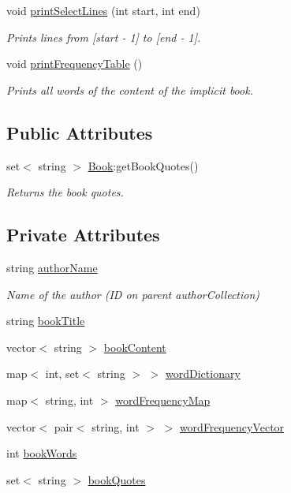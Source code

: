 \begin{DoxyCompactItemize}
void \hyperlink{class_book_a7193030998d6251851be26196762f8e6}{print\+Select\+Lines} (int start, int end)
\begin{DoxyCompactList}\small\item\em Prints lines from \mbox{[}start -\/ 1\mbox{]} to \mbox{[}end -\/ 1\mbox{]}. \end{DoxyCompactList}\item 
void \hyperlink{class_book_ac8b57c6a725ae9afeb24e6e74d4f8fd0}{print\+Frequency\+Table} ()
\begin{DoxyCompactList}\small\item\em Prints all words of the content of the implicit book. \end{DoxyCompactList}\end{DoxyCompactItemize}
\subsection*{Public Attributes}
\begin{DoxyCompactItemize}
\item 
set$<$ string $>$ \hyperlink{class_book_a5fea5dce5ba03d79378b2000f255de49}{Book}\+:get\+Book\+Quotes()
\begin{DoxyCompactList}\small\item\em Returns the book quotes. \end{DoxyCompactList}\end{DoxyCompactItemize}
\subsection*{Private Attributes}
\begin{DoxyCompactItemize}
\item 
string \hyperlink{class_book_a0dcb8f78ffb56c34e28f5d672b422e2a}{author\+Name}
\begin{DoxyCompactList}\small\item\em Name of the author (I\+D on parent author\+Collection) \end{DoxyCompactList}\item 
string \hyperlink{class_book_a111d7b30bddd6166bd09764f050cfee3}{book\+Title}
\item 
vector$<$ string $>$ \hyperlink{class_book_a62ca3f4431b699fa41384c8bab7ef4fa}{book\+Content}
\item 
map$<$ int, set$<$ string $>$ $>$ \hyperlink{class_book_a3e21a804bd433b6c1b05790856ec973f}{word\+Dictionary}
\item 
map$<$ string, int $>$ \hyperlink{class_book_a18b73c8d2b492cad5b7b0c187b08dfc0}{word\+Frequency\+Map}
\item 
vector$<$ pair$<$ string, int $>$ $>$ \hyperlink{class_book_ac58a87d14a302f7d437c1eaa1f1901fb}{word\+Frequency\+Vector}
\item 
int \hyperlink{class_book_a36f1e0b30a0ad17606976556cab45a23}{book\+Words}
\item 
set$<$ string $>$ \hyperlink{class_book_a370478eab144c20de936e1b68923e1c0}{book\+Quotes}
\end{DoxyCompactItemize}


